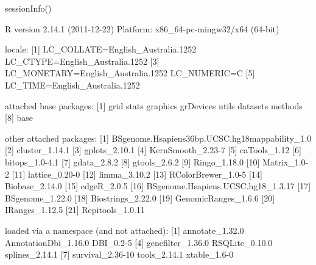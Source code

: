 \begin{Schunk}
\begin{Sinput}
 sessionInfo()
\end{Sinput}
\begin{Soutput}
R version 2.14.1 (2011-12-22)
Platform: x86_64-pc-mingw32/x64 (64-bit)

locale:
[1] LC_COLLATE=English_Australia.1252  LC_CTYPE=English_Australia.1252   
[3] LC_MONETARY=English_Australia.1252 LC_NUMERIC=C                      
[5] LC_TIME=English_Australia.1252    

attached base packages:
[1] grid      stats     graphics  grDevices utils     datasets  methods  
[8] base     

other attached packages:
 [1] BSgenome.Hsapiens36bp.UCSC.hg18mappability_1.0
 [2] cluster_1.14.1                                
 [3] gplots_2.10.1                                 
 [4] KernSmooth_2.23-7                             
 [5] caTools_1.12                                  
 [6] bitops_1.0-4.1                                
 [7] gdata_2.8.2                                   
 [8] gtools_2.6.2                                  
 [9] Ringo_1.18.0                                  
[10] Matrix_1.0-2                                  
[11] lattice_0.20-0                                
[12] limma_3.10.2                                  
[13] RColorBrewer_1.0-5                            
[14] Biobase_2.14.0                                
[15] edgeR_2.0.5                                   
[16] BSgenome.Hsapiens.UCSC.hg18_1.3.17            
[17] BSgenome_1.22.0                               
[18] Biostrings_2.22.0                             
[19] GenomicRanges_1.6.6                           
[20] IRanges_1.12.5                                
[21] Repitools_1.0.11                              

loaded via a namespace (and not attached):
[1] annotate_1.32.0      AnnotationDbi_1.16.0 DBI_0.2-5           
[4] genefilter_1.36.0    RSQLite_0.10.0       splines_2.14.1      
[7] survival_2.36-10     tools_2.14.1         xtable_1.6-0        
\end{Soutput}
\end{Schunk}

